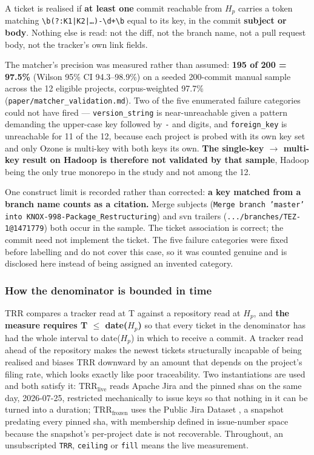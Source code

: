 \documentclass[sigconf,review,anonymous]{acmart}
\begin{document}
A ticket is realised if \textbf{at least one} commit reachable from $H_p$ carries a token matching \texttt{\textbackslash{}b(?:K1|K2|\ldots{})-\allowbreak{}\textbackslash{}d+\textbackslash{}b} equal to its key, in the commit \textbf{subject or body}. Nothing else is read: not the diff, not the branch name, not a pull request body, not the tracker's own link fields.

The matcher's precision was measured rather than assumed: \textbf{195 of 200 = 97.5\%} (Wilson 95\% CI 94.3--98.9\%) on a seeded 200-commit manual sample across the 12 eligible projects, corpus-weighted 97.7\% (\texttt{paper/\allowbreak{}matcher\_\allowbreak{}validation.\allowbreak{}md}). Two of the five enumerated failure categories could not have fired --- \texttt{version\_\allowbreak{}string} is near-unreachable given a pattern demanding the upper-case key followed by \texttt{-\allowbreak{}} and digits, and \texttt{foreign\_\allowbreak{}key} is unreachable for 11 of the 12, because each project is probed with its own key set and only Ozone is multi-key with both keys its own. \textbf{The single-key $\rightarrow$ multi-key result on Hadoop is therefore not validated by that sample}, Hadoop being the only true monorepo in the study and not among the 12.

One construct limit is recorded rather than corrected: \textbf{a key matched from a branch name counts as a citation.} Merge subjects (\texttt{Merge branch 'master' into KNOX-\allowbreak{}998-\allowbreak{}Package\_\allowbreak{}Restructuring}) and svn trailers (\texttt{.\allowbreak{}.\allowbreak{}.\allowbreak{}/\allowbreak{}branches/\allowbreak{}TEZ-\allowbreak{}1@1471779}) both occur in the sample. The ticket association is correct; the commit need not implement the ticket. The five failure categories were fixed before labelling and do not cover this case, so it was counted genuine and is disclosed here instead of being assigned an invented category.

\subsubsection{How the denominator is bounded in time}
\label{sec:3.1.3}

TRR compares a tracker read at T against a repository read at $H_p$, and \textbf{the measure requires T $\leq$ date($H_p$)} so that every ticket in the denominator has had the whole interval to date($H_p$) in which to receive a commit. A tracker read ahead of the repository makes the newest tickets structurally incapable of being realised and biases TRR downward by an amount that depends on the project's filing rate, which looks exactly like poor traceability. Two instantiations are used and both satisfy it: \textbf{$\mathrm{TRR}_\mathrm{live}$} reads Apache Jira and the pinned shas on the same day, 2026-07-25, restricted mechanically to issue keys so that nothing in it can be turned into a duration; \textbf{$\mathrm{TRR}_\mathrm{frozen}$} uses the Public Jira Dataset \cite{montgomery2025jira}, a snapshot predating every pinned sha, with membership defined in issue-number space because the snapshot's per-project date is not recoverable. Throughout, an unsubscripted \texttt{TRR}, \texttt{ceiling} or \texttt{fill} means the live measurement.
\end{document}
